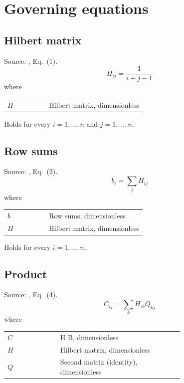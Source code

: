 \section{Governing equations}

\subsection{Hilbert matrix}
Source: \cite{ref}, Eq.~(1).
\begin{equation}
  H_{ij} = \frac{1}{i + j - 1}
  \label{eq:hilbert-matrix}
\end{equation}
\noindent where

\noindent\begin{tabular}{@{\quad}l@{\quad}p{0.7\linewidth}@{}}
  $H$ & Hilbert matrix, dimensionless \\
\end{tabular}

\noindent Holds for every $i = 1, \dots, n$ and $j = 1, \dots, n$.

\subsection{Row sums}
Source: \cite{ref}, Eq.~(2).
\begin{equation}
  b_i = \sum_j H_{ij}
  \label{eq:row-sums}
\end{equation}
\noindent where

\noindent\begin{tabular}{@{\quad}l@{\quad}p{0.7\linewidth}@{}}
  $b$ & Row sums, dimensionless \\
  $H$ & Hilbert matrix, dimensionless \\
\end{tabular}

\noindent Holds for every $i = 1, \dots, n$.

\subsection{Product}
Source: \cite{ref}, Eq.~(4).
\begin{equation}
  C_{ij} = \sum_k H_{ik} Q_{kj}
  \label{eq:product}
\end{equation}
\noindent where

\noindent\begin{tabular}{@{\quad}l@{\quad}p{0.7\linewidth}@{}}
  $C$ & H B, dimensionless \\
  $H$ & Hilbert matrix, dimensionless \\
  $Q$ & Second matrix (identity), dimensionless \\
\end{tabular}

